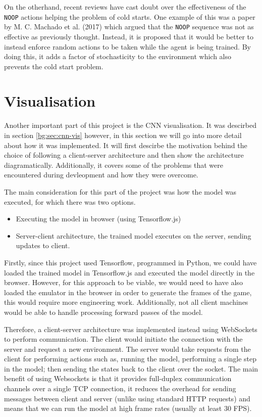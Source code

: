 On the otherhand, recent reviews have cast doubt over the effectiveness of the \texttt{NOOP} actions helping the problem of cold starts. One example of this was a paper by M. C. Machado et al. (2017) \cite{machado2017revisiting} which argued that the \texttt{NOOP} sequence was not as effective as previously thought. Instead, it is proposed that it would be better to instead enforce random actions to be taken while the agent is being trained. By doing this, it adds a factor of stochasticity to the environment which also prevents the cold start problem.

\section{Visualisation}

Another important part of this project is the CNN visualisation. It was descirbed in section \ref{bg:sec:cnn-vis} however, in this section we will go into more detail about how it was implemented. It will first descirbe the motivation behind the choice of following a client-server architecture and then show the architecture diagramatically. Additionally, it covers some of the problems that were encountered during devleopment and how they were overcome.

The main consideration for this part of the project was how the model was executed, for which there was two options.

\begin{itemize}
	\item Executing the model in browser (using Tensorflow.js)
	\item Server-client architecture, the trained model executes on the server, sending updates to client.
\end{itemize}

Firstly, since this project used Tensorflow, programmed in Python, we could have loaded the trained model in Tensorflow.js and executed the model directly in the browser. However, for this approach to be viable, we would need to have also loaded the emulator in the browser in order to generate the frames of the game, this would require more engineering work. Additionally, not all client machines would be able to handle processing forward passes of the model.

Therefore, a client-server architecture was implemented instead using WebSockets to perform communication. The client would initiate the connection with the server and request a new environment. The server would take requests from the client for performing actions such as, running the model, performing a single step in the model; then sending the states back to the client over the socket. The main benefit of using Websockets is that it provides full-duplex communication channels over a single TCP connection, it reduces the overhead for sending messages between client and server (unlike using standard HTTP requests) and means that we can run the model at high frame rates (usually at least 30 FPS).

